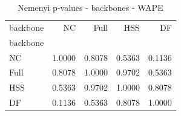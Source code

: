 \begin{table}
\caption{Nemenyi p-values - backbones - WAPE}
\label{tab:nemenyi_backbones_wape}
\begin{tabular}{lrrrr}
\toprule
backbone & NC & Full & HSS & DF \\
backbone &  &  &  &  \\
\midrule
NC & 1.0000 & 0.8078 & 0.5363 & 0.1136 \\
Full & 0.8078 & 1.0000 & 0.9702 & 0.5363 \\
HSS & 0.5363 & 0.9702 & 1.0000 & 0.8078 \\
DF & 0.1136 & 0.5363 & 0.8078 & 1.0000 \\
\bottomrule
\end{tabular}
\end{table}
